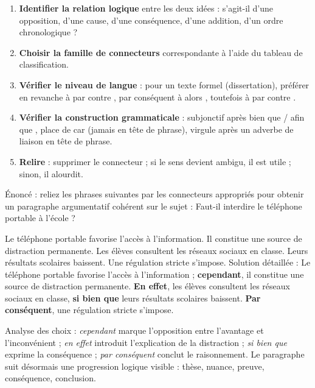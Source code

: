 \documentclass[11pt]{article}
\begin{document}
\begin{methode}
\begin{enumerate}
\item \textbf{Identifier la relation logique} entre les deux idées : s'agit-il d'une opposition, d'une cause, d'une conséquence, d'une addition, d'un ordre chronologique ?
\item \textbf{Choisir la famille de connecteurs} correspondante à l'aide du tableau de classification.
\item \textbf{Vérifier le niveau de langue} : pour un texte formel (dissertation), préférer \og en revanche \fg{} à \og par contre \fg{}, \og par conséquent \fg{} à \og alors \fg{}, \og toutefois \fg{} à \og par contre \fg{}.
\item \textbf{Vérifier la construction grammaticale} : subjonctif après \og bien que / afin que \fg{}, place de \og car \fg{} (jamais en tête de phrase), virgule après un adverbe de liaison en tête de phrase.
\item \textbf{Relire} : supprimer le connecteur ; si le sens devient ambigu, il est utile ; sinon, il alourdit.
\end{enumerate}
\end{methode}

\begin{exoresolu}
Énoncé : reliez les phrases suivantes par les connecteurs appropriés pour obtenir un paragraphe argumentatif cohérent sur le sujet : \og Faut-il interdire le téléphone portable à l'école ? \fg{}

\og Le téléphone portable favorise l'accès à l'information. Il constitue une source de distraction permanente. Les élèves consultent les réseaux sociaux en classe. Leurs résultats scolaires baissent. Une régulation stricte s'impose. \fg{}
\tcblower
Solution détaillée : \og Le téléphone portable favorise l'accès à l'information ; \textbf{cependant}, il constitue une source de distraction permanente. \textbf{En effet}, les élèves consultent les réseaux sociaux en classe, \textbf{si bien que} leurs résultats scolaires baissent. \textbf{Par conséquent}, une régulation stricte s'impose. \fg{}

Analyse des choix : \emph{cependant} marque l'opposition entre l'avantage et l'inconvénient ; \emph{en effet} introduit l'explication de la distraction ; \emph{si bien que} exprime la conséquence ; \emph{par conséquent} conclut le raisonnement. Le paragraphe suit désormais une progression logique visible : thèse, nuance, preuve, conséquence, conclusion.
\end{exoresolu}
\end{document}
